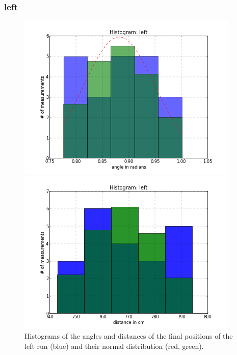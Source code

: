 \documentclass{scrartcl}
\begin{document}
\subsubsection{left}
\begin{figure}[H]
\centering
\begin{minipage}{.5\textwidth}
  \centering
  \includegraphics[width=1.0\linewidth]{img/Angles_left_f.png}
\end{minipage}%
\begin{minipage}{.5\textwidth}
  \centering
  \includegraphics[width=1.0\linewidth]{img/Distances_left_f.png}
\end{minipage}
\caption{Histograms of the angles and distances of the final positions of the left run (blue) and their normal distribution (red, green).}
\end{figure}
\end{document}
